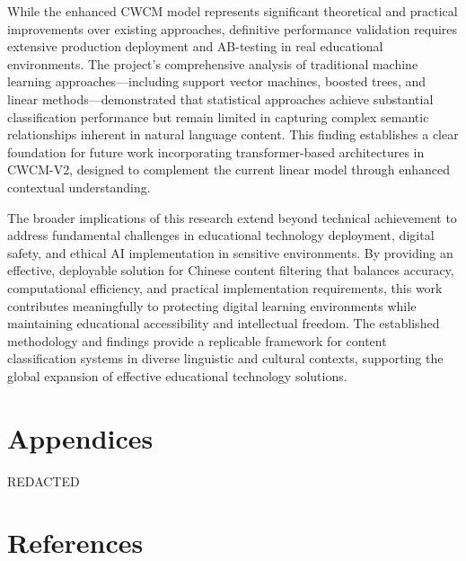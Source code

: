 \documentclass[
  titlepage]{article}
\begin{document}
While the enhanced CWCM model represents significant theoretical and
practical improvements over existing approaches, definitive performance
validation requires extensive production deployment and AB-testing in
real educational environments. The project's comprehensive analysis of
traditional machine learning approaches---including support vector
machines, boosted trees, and linear methods---demonstrated that
statistical approaches achieve substantial classification performance
but remain limited in capturing complex semantic relationships inherent
in natural language content. This finding establishes a clear foundation
for future work incorporating transformer-based architectures in
CWCM-V2, designed to complement the current linear model through
enhanced contextual understanding.

The broader implications of this research extend beyond technical
achievement to address fundamental challenges in educational technology
deployment, digital safety, and ethical AI implementation in sensitive
environments. By providing an effective, deployable solution for Chinese
content filtering that balances accuracy, computational efficiency, and
practical implementation requirements, this work contributes
meaningfully to protecting digital learning environments while
maintaining educational accessibility and intellectual freedom. The
established methodology and findings provide a replicable framework for
content classification systems in diverse linguistic and cultural
contexts, supporting the global expansion of effective educational
technology solutions.

\section*{Appendices}\label{appendices}

REDACTED

\section*{References}\label{references}
\end{document}
